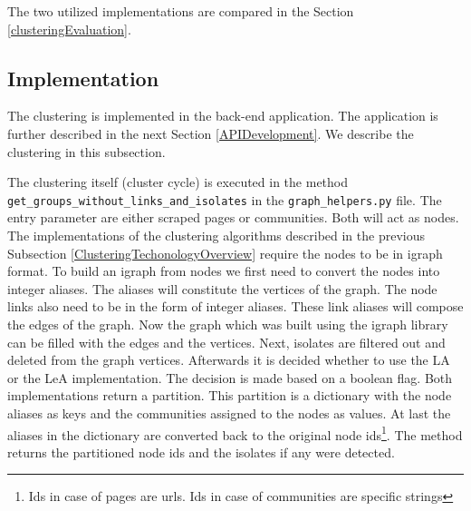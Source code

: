 The two utilized implementations are compared in the Section \ref{clusteringEvaluation}.

\subsection{Implementation} \label{ClusteringImplementation}
The clustering is implemented in the back-end application. The application is further described in the next Section \ref{APIDevelopment}. We describe the clustering in this subsection. 

The clustering itself (cluster cycle) is executed in the method \\ \texttt{get\_groups\_without\_links\_and\_isolates} in the \texttt{graph\_helpers.py} file. The entry parameter are either scraped pages or communities. Both will act as nodes. The implementations of the clustering algorithms described in the previous Subsection \ref{ClusteringTechonologyOverview} require the nodes to be in igraph format. To build an igraph from nodes we first need to convert the nodes into integer aliases. The aliases will constitute the vertices of the graph. The node links also need to be in the form of integer aliases. These link aliases will compose the edges of the graph. Now the graph which was built using the igraph library can be filled with the edges and the vertices. Next, isolates are filtered out and deleted from the graph vertices. Afterwards it is decided whether to use the LA or the LeA implementation. The decision is made based on a boolean flag. Both implementations return a partition. This partition is a dictionary with the node aliases as keys and the communities assigned to the nodes as values. At last the aliases in the dictionary are converted back to the original node ids\footnote{Ids in case of pages are urls. Ids in case of communities are specific strings}. The method returns the partitioned node ids and the isolates if any were detected. 

